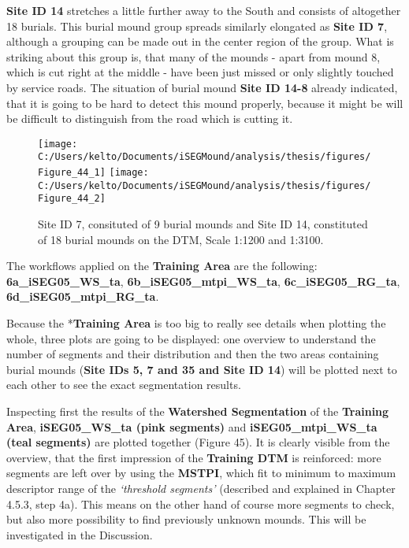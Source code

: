 \documentclass[
  12pt,
]{article}
\begin{document}
\textbf{Site ID 14} stretches a little further away to the South and consists of altogether 18 burials. This burial mound group spreads similarly elongated as \textbf{Site ID 7}, although a grouping can be made out in the center region of the group. What is striking about this group is, that many of the mounds - apart from mound 8, which is cut right at the middle - have been just missed or only slightly touched by service roads. The situation of burial mound \textbf{Site ID 14-8} already indicated, that it is going to be hard to detect this mound properly, because it might be will be difficult to distinguish from the road which is cutting it.

\begin{figure}
\texttt{[image: C:/Users/kelto/Documents/iSEGMound/analysis/thesis/figures/Figure\_44\_1]} \texttt{[image: C:/Users/kelto/Documents/iSEGMound/analysis/thesis/figures/Figure\_44\_2]} \caption{Site ID 7, consituted of 9 burial mounds and Site ID 14, constituted of 18 burial mounds on the DTM, Scale 1:1200 and 1:3100.}\label{fig:Figure44}
\end{figure}

The workflows applied on the \textbf{Training Area} are the following:
\newline
\textbf{6a\_iSEG05\_WS\_ta}, \textbf{6b\_iSEG05\_mtpi\_WS\_ta}, \textbf{6c\_iSEG05\_RG\_ta}, \textbf{6d\_iSEG05\_mtpi\_RG\_ta}.

Because the *\textbf{Training Area} is too big to really see details when plotting the whole, three plots are going to be displayed: one overview to understand the number of segments and their distribution and then the two areas containing burial mounds (\textbf{Site IDs 5, 7 and 35 and Site ID 14}) will be plotted next to each other to see the exact segmentation results.

Inspecting first the results of the \textbf{Watershed Segmentation} of the \textbf{Training Area}, \textbf{iSEG05\_WS\_ta (pink segments)} and \textbf{iSEG05\_mtpi\_WS\_ta (teal segments)} are plotted together (Figure 45). It is clearly visible from the overview, that the first impression of the \textbf{Training DTM} is reinforced: more segments are left over by using the \textbf{MSTPI}, which fit to minimum to maximum descriptor range of the \emph{`threshold segments'} (described and explained in Chapter 4.5.3, step 4a). This means on the other hand of course more segments to check, but also more possibility to find previously unknown mounds. This will be investigated in the Discussion.
\end{document}
